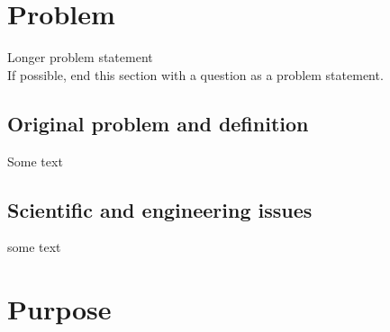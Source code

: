 \section{Problem}
\label{sec:problem}

Longer problem statement\\
If possible, end this section with a question as a problem statement.

\subsection{Original problem and definition}
\label{sec:researchQuestion}
Some text

\subsection{Scientific and engineering issues}%
some text

\section{Purpose}



